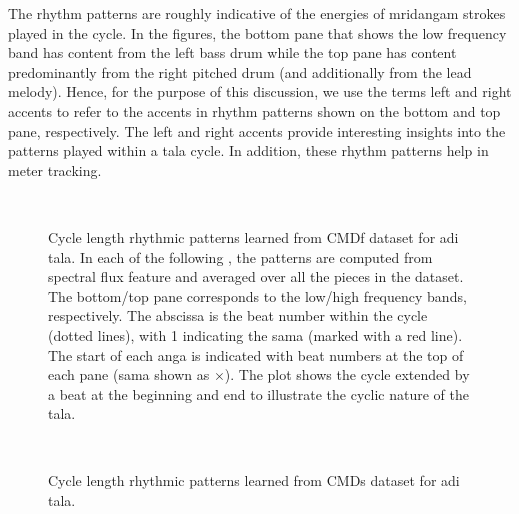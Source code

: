 The rhythm patterns are roughly indicative of the energies of mridangam strokes played in the cycle. In the figures, the bottom pane that shows the low frequency band has content from the left bass drum while the top pane has content predominantly from the right pitched drum (and additionally from the lead melody). Hence, for the purpose of this discussion, we use the terms left and right accents to refer to the accents in rhythm patterns shown on the bottom and top pane, respectively. The left and right accents provide interesting insights into the patterns played within a \gls{tala} cycle. In addition, these rhythm patterns help in meter tracking. 
\begin{figure}[t]
\captionsetup[subfigure]{labelformat=empty}
\centering
{} \\ \vspace{-1.35cm}
\caption[Rhythm patterns in \gls{adi} \gls{tala} learned from \acrshort{CMDf} dataset]{Cycle length rhythmic patterns learned from \acrshort{CMDf} dataset for \gls{adi} \gls{tala}. In each of the following \protect{}, the patterns are computed from spectral flux feature and averaged over all the pieces in the dataset. The bottom/top pane corresponds to the low/high frequency bands, respectively. The abscissa is the beat number within the cycle (dotted lines), with 1 indicating the \gls{sama} (marked with a red line). The start of each \gls{anga} is indicated with beat numbers at the top of each pane (\gls{sama} shown as $\times$). The plot shows the cycle extended by a beat at the beginning and end to illustrate the cyclic nature of the \gls{tala}.}\label{fig:tt:CMDf:adi} %
\end{figure}
%
\begin{figure}
\captionsetup[subfigure]{labelformat=empty}
\centering
{} \\ \vspace{-1.35cm}
\caption[Rhythm patterns in \gls{adi} \gls{tala} learned from \acrshort{CMDs} dataset]{Cycle length rhythmic patterns learned from \acrshort{CMDs} dataset for \gls{adi} \gls{tala}.}\label{fig:tt:CMD:adi}
\end{figure}

